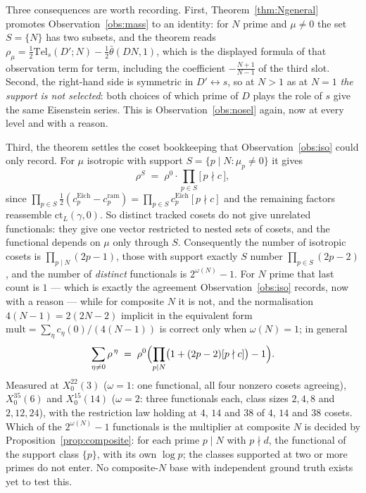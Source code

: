 \documentclass[11pt,reqno]{amsart}
\theoremstyle{plain}
\theoremstyle{definition}
\begin{document}
Three consequences are worth recording. First, Theorem~\ref{thm:Ngeneral} promotes
Observation~\ref{obs:mass} to an identity: for $N$ prime and $\mu\neq0$ the set
$S=\{N\}$ has two subsets, and the theorem reads
$\rho_\mu=\tfrac12\mathrm{Tel}_s(D';N)-\tfrac12\bar\theta(DN,1)$, which is the displayed
formula of that observation term for term, including the coefficient
$-\tfrac{N+1}{N-1}$ of the third slot. Second, the right-hand side is symmetric in
$D'\leftrightarrow s$, so at $N>1$ as at $N=1$ \emph{the support is not selected}: both
choices of which prime of $D$ plays the role of $s$ give the same Eisenstein series. This
is Observation~\ref{obs:nosel} again, now at every level and with a reason.

Third, the theorem settles the coset bookkeeping that Observation~\ref{obs:iso} could only
record. For $\mu$ isotropic with support $S=\{p\mid N:\mu_p\neq0\}$ it gives
\[
  \rho^{S}\;=\;\rho^{0}\cdot\prod_{p\in S}\bigl[\,p\nmid c\,\bigr],
\]
since $\prod_{p\in S}\tfrac12(c_p^{\mathrm{Eich}}-c_p^{\mathrm{ram}})
=\prod_{p\in S}c_p^{\mathrm{Eich}}[p\nmid c]$ and the remaining factors reassemble
$\mathrm{ct}_L(\gamma,0)$. So distinct tracked cosets do not give unrelated functionals: they give
one vector restricted to nested sets of cosets, and the functional depends on $\mu$ only through
$S$. Consequently the number of isotropic cosets is $\prod_{p\mid N}(2p-1)$, those with support
exactly $S$ number $\prod_{p\in S}(2p-2)$, and the number of \emph{distinct} functionals is
$2^{\omega(N)}-1$. For $N$ prime that last count is $1$ --- which is exactly the agreement
Observation~\ref{obs:iso} records, now with a reason --- while for composite $N$ it is not, and
the normalisation $4(N-1)=2(2N-2)$ implicit in the equivalent form
$\mathrm{mult}=\sum_\eta c_\eta(0)/(4(N-1))$ is correct only when $\omega(N)=1$; in general
\[
  \sum_{\eta\neq0}\rho^{\,\eta}
  \;=\;\rho^{0}\Bigl(\prod_{p\mid N}\bigl(1+(2p-2)[p\nmid c]\bigr)-1\Bigr).
\]
Measured at $X_0^{22}(3)$ ($\omega=1$: one functional, all four nonzero cosets agreeing),
$X_0^{35}(6)$ and $X_0^{15}(14)$ ($\omega=2$: three functionals each, class sizes $2,4,8$ and
$2,12,24$), with the restriction law holding at $4$, $14$ and $38$ of $4$, $14$ and $38$ cosets.
Which of the $2^{\omega(N)}-1$ functionals is the multiplier at composite $N$ is decided by
Proposition~\ref{prop:composite}: for each prime $p\mid N$ with $p\nmid d$, the functional of the
support class $\{p\}$, with its own $\log p$; the classes supported at two or more primes do not
enter. No composite-$N$ base with independent ground truth exists yet to test this.
\end{document}
